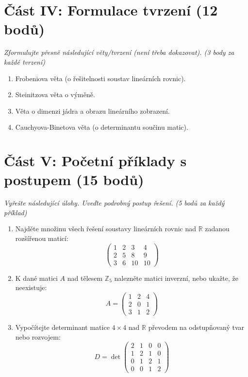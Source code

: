 \documentclass[a4paper,11pt]{article}
\begin{document}
\vspace{0.5cm}

\section*{Část IV: Formulace tvrzení (12 bodů)}
\textit{Zformulujte přesně následující věty/tvrzení (není třeba dokazovat). (3 body za každé tvrzení)}

\begin{enumerate}
    \item Frobeniova věta (o řešitelnosti soustav lineárních rovnic).
    \item Steinitzova věta o výměně.
    \item Věta o dimenzi jádra a obrazu lineárního zobrazení.
    \item Cauchyova-Binetova věta (o determinantu součinu matic).
\end{enumerate}

\newpage

\section*{Část V: Početní příklady s postupem (15 bodů)}
\textit{Vyřešte následující úlohy. Uveďte podrobný postup řešení. (5 bodů za každý příklad)}

\begin{enumerate}
    \item Najděte množinu všech řešení soustavy lineárních rovnic nad $\mathbb{R}$ zadanou rozšířenou maticí:
    $$
    \left( \begin{array}{ccc|c}
    1 & 2 & 3 & 4 \\
    2 & 5 & 8 & 9 \\
    3 & 6 & 10 & 10
    \end{array} \right)
    $$
    
    \item K dané matici $A$ nad tělesem $\mathbb{Z}_5$ nalezněte matici inverzní, nebo ukažte, že neexistuje:
    $$
    A = \begin{pmatrix} 1 & 2 & 4 \\ 2 & 0 & 1 \\ 3 & 1 & 2 \end{pmatrix}
    $$
    
    \item Vypočítejte determinant matice $4 \times 4$ nad $\mathbb{R}$ převodem na odstupňovaný tvar nebo rozvojem:
    $$
    D = \det \begin{pmatrix} 
    2 & 1 & 0 & 0 \\
    1 & 2 & 1 & 0 \\
    0 & 1 & 2 & 1 \\
    0 & 0 & 1 & 2 
    \end{pmatrix}
    $$
\end{enumerate}
\end{document}
